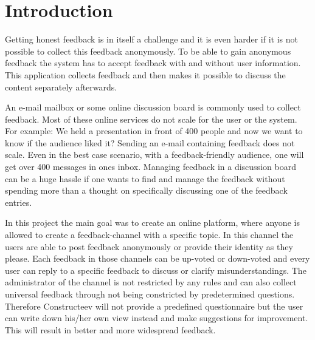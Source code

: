 
\cleardoublepage

\chapter{Introduction}

\setcounter{page}{1}

Getting honest feedback is in itself a challenge and it is even harder if it is not possible to collect this feedback anonymously. To be able to gain anonymous feedback the system has to accept feedback with and without user information. This application collects feedback and then makes it possible to discuss the content separately afterwards.


An e-mail mailbox or some online discussion board is commonly used to collect feedback. Most of these online services do not scale for the user or the system. 
For example: We held a presentation in front of 400 people and now we want to know if the audience liked it? Sending an e-mail containing feedback does not scale. Even in the best case scenario, with a feedback-friendly audience, one will get over 400 messages in ones inbox. Managing feedback in a discussion board can be a huge hassle if one wants to find and manage the feedback without spending more than a thought on specifically discussing one of the feedback entries.

In this project the main goal was to create an online platform, where anyone is allowed to create a feedback-channel with a specific topic. In this channel the users are able to post feedback anonymously or provide their identity as they please. Each feedback in those channels can be up-voted or down-voted and every user can reply to a specific feedback to discuss or clarify misunderstandings. The administrator of the channel is not restricted by any rules and can also collect universal feedback through not being constricted by predetermined questions. Therefore Constructeev will not provide a predefined questionnaire but the user can write down his/her own view instead and make suggestions for improvement. This will result in better and more widespread feedback.

\cleardoublepage
